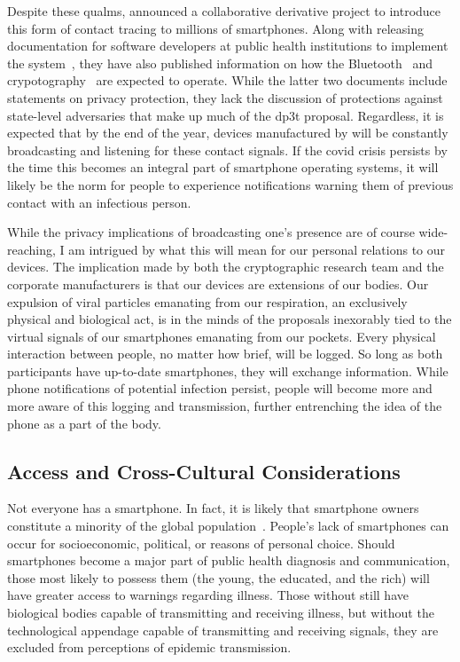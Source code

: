 \documentclass[russian,american]{../../../coursework}
\begin{document}
Despite these qualms, \textcite{AppleCT.Announcement} announced a collaborative
derivative project to introduce this form of contact tracing to millions of
smartphones. Along with releasing documentation for software developers at public
health institutions to implement the system~\parencite*{AppleCT.API}, they have also
published information on how the Bluetooth~\parencite*{AppleCT.Bluetooth} and
crypotography~\parencite*{AppleCT.Crypto} are expected to operate.
While the latter two documents include statements on privacy protection, they lack
the discussion of protections against state-level adversaries that make up
much of the \ac{dp3t} proposal.
Regardless, it is expected that by the end of the year, devices manufactured by
\citeauthor{AppleCT.Announcement} will be constantly broadcasting and listening
for these contact signals. If the \ac{covid} crisis persists by the time this
becomes an integral part of smartphone operating systems, it will likely be the
norm for people to experience notifications warning them of previous contact
with an infectious person.

While the privacy implications of broadcasting one's presence are of course 
wide-reaching, I am intrigued by what this will mean for our personal relations
to our devices. The implication made by both the cryptographic research team
and the corporate manufacturers is that our devices are extensions of our bodies.
Our expulsion of viral particles emanating from our respiration, an exclusively physical and biological act,
is in the minds of the proposals inexorably tied to the virtual signals of our
smartphones emanating from our pockets. 
Every physical interaction between people, no matter how brief, will be logged.
So long as both participants have up-to-date smartphones, they will exchange
information. While phone notifications of potential infection persist, people
will become more and more aware of this logging and transmission, further
entrenching the idea of the phone as a part of the body.

\subsection{Access and Cross-Cultural Considerations}

Not everyone has a smartphone. In fact, it is likely that smartphone owners
constitute a minority of the global population~\parencite{pew.phone}.
People's lack of smartphones can occur for socioeconomic, political, or
reasons of personal choice. Should
smartphones become a major part of public health diagnosis and communication,
those most likely to possess them (the young, the educated, and the rich) will
have greater access to warnings regarding illness. 
Those without still have biological bodies capable of transmitting and receiving
illness, but without the technological appendage capable of transmitting and
receiving signals, they are excluded from perceptions of epidemic transmission.
\end{document}
